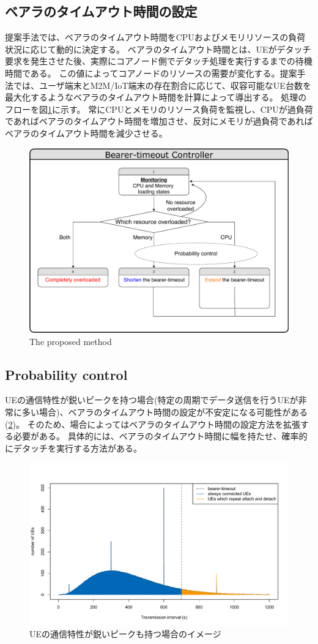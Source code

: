 \documentclass[a4j]{ujarticle}
\begin{document}
\subsection{ベアラのタイムアウト時間の設定}
提案手法では、ベアラのタイムアウト時間をCPUおよびメモリリソースの負荷状況に応じて動的に決定する。
ベアラのタイムアウト時間とは、UEがデタッチ要求を発生させた後、実際にコアノード側でデタッチ処理を実行するまでの待機時間である。
この値によってコアノードのリソースの需要が変化する。提案手法では、ユーザ端末とM2M/IoT端末の存在割合に応じて、収容可能なUE台数を最大化するようなベアラのタイムアウト時間を計算によって導出する。
処理のフローを図\ref{proposed_method}に示す。
常にCPUとメモリのリソース負荷を監視し、CPUが過負荷であればベアラのタイムアウト時間を増加させ、反対にメモリが過負荷であればベアラのタイムアウト時間を減少させる。
\begin{figure}[htbp]
	\centering
	\includegraphics[width=0.7\hsize]{proposed_method.pdf}
  \caption{The proposed method}
	\label{proposed_method}
\end{figure}

\subsection{Probability control}
UEの通信特性が鋭いピークを持つ場合(特定の周期でデータ送信を行うUEが非常に多い場合)、ベアラのタイムアウト時間の設定が不安定になる可能性がある(\ref{spike})。
そのため、場合によってはベアラのタイムアウト時間の設定方法を拡張する必要がある。
具体的には、ベアラのタイムアウト時間に幅を持たせ、確率的にデタッチを実行する方法がある。
\begin{figure}[htbp]
	\centering
	\includegraphics[width=0.8\hsize]{spike.pdf}
  \caption{UEの通信特性が鋭いピークも持つ場合のイメージ}
	\label{spike}
\end{figure}
\end{document}
